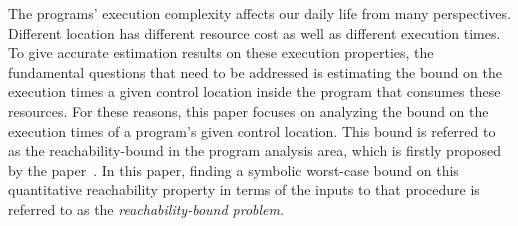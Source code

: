 The programs' execution complexity affects our daily life from many perspectives.
Different location has different resource cost as well as different execution times. 
To give accurate estimation results on these execution properties,
the fundamental questions that need to be addressed 
is estimating the bound on the execution times
a given control location inside the program that consumes these resources.
For these reasons, this paper focuses on analyzing the bound on the execution times of a program's given control location.
This bound is referred to as the reachability-bound in the program analysis area,
which is firstly proposed by the paper~\cite{GulwaniZ10}.
In this paper, finding a symbolic worst-case bound on this quantitative reachability property
in terms of the inputs to that procedure
is referred to as the \emph{reachability-bound problem}.

